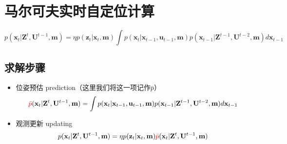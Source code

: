 \documentclass[../main.tex]{subfiles}
\begin{document}
\section{马尔可夫实时自定位计算}
\[ p(\mathbf{x}_{t}|\mathbf{Z}^{t},\mathbf{U}^{t-1},\mathbf{m})=\eta p(\mathbf{z}_{t}|\mathbf{x}_{t},\mathbf{m})\int p(\mathbf{x}_{t}|\mathbf{x}_{t-1},\mathbf{u}_{t-1},\mathbf{m})p(\mathbf{x}_{t-1}|\mathbf{Z}^{t-1},\mathbf{U}^{t-2},\mathbf{m})d\mathbf{x}_{t-1} \]
\subsection{求解步骤}
\begin{itemize}
    \item 位姿预估 prediction（这里我们将这一项记作$\bar{p}$）
$$
\textcolor{red}{\bar{p}}(\mathbf{x}_{t}|\mathbf{Z}^{t},\mathbf{U}^{t-1},\mathbf{m})=\int p(\mathbf{x}_{t}|\mathbf{x}_{t-1},\mathbf{u}_{t-1},\mathbf{m})p(\mathbf{x}_{t-1}|\mathbf{Z}^{t-1},\mathbf{U}^{t-2},\mathbf{m})d\mathbf{x}_{t-1}$$
    \item 观测更新 updating
$$p(\mathbf{x}_{t}|\mathbf{Z}^{t},\mathbf{U}^{t-1},\mathbf{m})=\eta p(\mathbf{z}_{t}|\mathbf{x}_{t},\mathbf{m})\textcolor{red}{\bar{p}}(\mathbf{x}_{t}|\mathbf{Z}^{t},\mathbf{U}^{t-1},\mathbf{m})$$
\end{itemize}
{\small{}}
\end{document}
